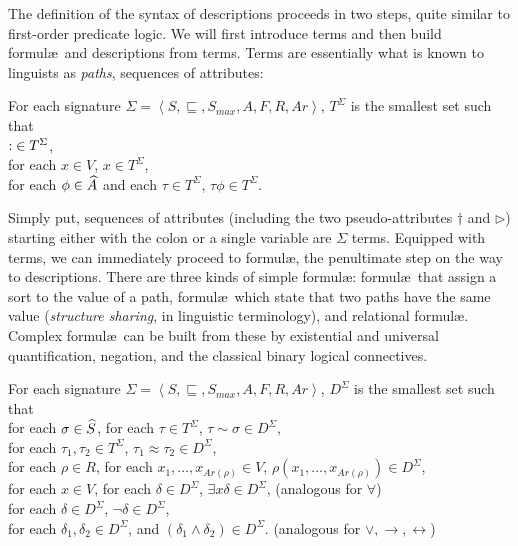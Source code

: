 \documentclass[output=paper
                ,modfonts
                ,nonflat
	        ,collection
	        ,collectionchapter
	        ,collectiontoclongg
 	        ,biblatex
                ,babelshorthands
                ,newtxmath
                ,draftmode
                ,colorlinks, citecolor=brown
]{./langsci/langscibook}
\begin{document}
{{The definition of the syntax of descriptions proceeds in two steps,
quite similar to first-order predicate logic. We will first introduce
terms and then build formul\ae\ and descriptions from terms. Terms are essentially
what is known to linguists as \emph{paths}, sequences of attributes:

\begin{mydef}\label{def-terms}
  For each signature $\Sigma=\left<S,\sqsubseteq,S_{max},A,F,R,Ar\right>$,
  $T^{\Sigma}$ is the smallest set such that\\
  $\operatorname{:}\in T^{\Sigma}$,\\
  for each $x\in V$, $x\in T^{\Sigma}$,\\
  for each $\phi \in \widehat{A}$ and each $\tau\in T^{\Sigma}$, $\tau\phi\in T^{\Sigma}$.
\end{mydef}

Simply put, sequences of attributes (including the two pseudo-attributes
$\dagger$ and $\triangleright$)
starting either with the colon or a single variable are $\Sigma$ terms.
Equipped with terms, we can immediately proceed to formul\ae, the penultimate
step on the way to descriptions.
There are three kinds of simple formul\ae: formul\ae\ that assign a sort
to the value of a path, formul\ae\ which state that two paths have the
same value (\emph{structure sharing}, in linguistic terminology), and
relational formul\ae. Complex formul\ae\ can be built from these by existential
and universal quantification, negation, and the classical binary logical
connectives.

\begin{mydef}
  For each signature $\Sigma=\left<S,\sqsubseteq,S_{max},A,F,R,Ar\right>$,
  $D^{\Sigma}$ is the smallest set such that\\
  for each $\sigma\in\widehat{S}$, for each $\tau\in T^{\Sigma}$,
  $\tau\sim\sigma\in D^{\Sigma}$,\\
  for each $\tau_1, \tau_2\in T^{\Sigma}$, $\tau_1 \approx \tau_2 \in D^{\Sigma}$,\\
  for each $\rho\in R$, for each $x_1, \ldots, x_{Ar(\rho)}\in V$,
  $\rho(x_1,\ldots,x_{Ar(\rho)})\in D^{\Sigma}$,\\
  for each $x\in V$, for each $\delta\in D^{\Sigma}$,
  $\exists x\delta\in D^{\Sigma}$, \hfill (analogous for $\forall$)\\
  for each $\delta\in D^{\Sigma}$, $\neg\delta\in D^{\Sigma}$,\\
  for each $\delta_1,\delta_2\in D^{\Sigma}$, and
  $\left(\delta_1\land\delta_2\right) \in D^{\Sigma}$.
  \hfill (analogous for $\lor,\rightarrow,\leftrightarrow$)
\end{mydef}

}}
\end{document}

